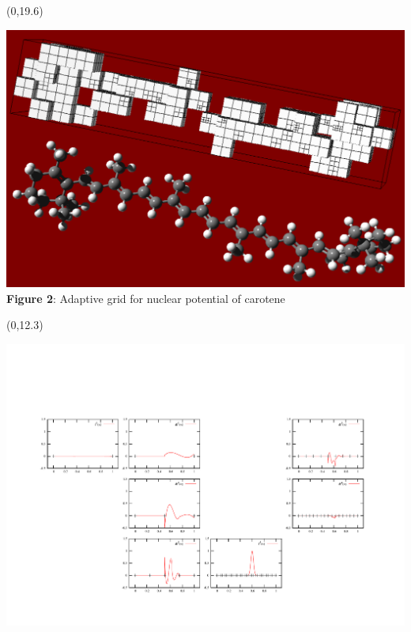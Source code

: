 \documentclass[a0,draft,portrait]{a0poster}
\begin{document}

\begin{textblock}{5}(0,19.6)
  \begin{center}
    \includegraphics[scale=0.6, viewport = 0 0 1000 650, clip]{figures/adapGrid.pdf}
	\footnotesize
	\\
	\textbf{Figure 2}: Adaptive grid for nuclear potential of carotene
  \end{center}
\end{textblock} 

\begin{textblock}{5}(0,12.3)
  \begin{center}
	\includegraphics[scale=1.45, viewport = 70 320 410 440, clip]{figures/decomp1.pdf}
  \end{center}
\end{textblock} 
\end{document}
